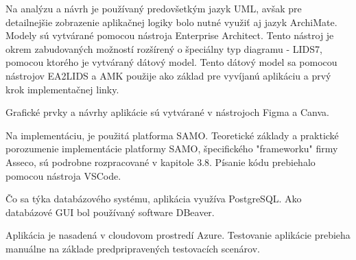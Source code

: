 Na analýzu a návrh je používaný predovšetkým jazyk UML, avšak pre detailnejšie zobrazenie aplikačnej logiky bolo nutné využiť aj jazyk ArchiMate. Modely sú vytvárané pomocou nástroja Enterprise Architect. Tento nástroj je okrem zabudovaných možností rozšírený o špeciálny typ diagramu - LIDS7, pomocou ktorého je vytváraný dátový model. Tento dátový model sa pomocou nástrojov EA2LIDS a AMK použije ako základ pre vyvíjanú aplikáciu a prvý krok implementačnej linky. 

Grafické prvky a návrhy aplikácie sú vytvárané v nástrojoch Figma a Canva.

Na implementáciu, je použitá platforma SAMO. Teoretické základy a praktické porozumenie implementácie platformy SAMO, špecifického "frameworku" firmy Asseco, sú podrobne rozpracované v kapitole 3.8. Písanie kódu prebiehalo pomocou nástroja VSCode.

Čo sa týka databázového systému, aplikácia využíva PostgreSQL. Ako databázové GUI bol používaný software DBeaver.

Aplikácia je nasadená v cloudovom prostredí Azure. Testovanie aplikácie prebieha manuálne na základe predpripravených testovacích scenárov.


%




%
%
%
%
%
%


